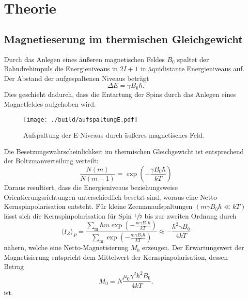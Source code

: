 \section{Theorie}%
\label{sec:theorie}
\subsection{Magnetieserung im thermischen Gleichgewicht}%
\label{ssub:magnetieserung_im_thermischen_gleichgewicht}
Durch das Anlegen eines äußeren magnetischen Feldes $B_0$ spaltet der Bahndrehimpuls die Energieniveaus in $2 I
+ 1$ in äquidistante Energieniveaus auf. 
Der Abstand der aufgespaltenen Niveaus beträgt 
\begin{equation}
		\label{eq:delta_e}
		\Delta E = \gamma B_0 \hbar. 
\end{equation}
Dies geschieht dadurch, dass die Entartung der Spins durch das Anlegen eines
Magnetfeldes aufgehoben wird.
\begin{figure}[ht]
		\centering
		\texttt{[image: ./build/aufspaltungE.pdf]}
		\caption{Aufspaltung der E-Niveaus durch äußeres magnetisches
		Feld. \cite{anleitung}}
		\label{fig:aufsp_E}
\end{figure}
Die Besetzungswahrscheinlichkeit im thermischen Gleichgewicht ist entsprechend
der Boltzmanverteilung verteilt:
\begin{equation}
		\label{eq:boltzmann}
		\frac{N(m)}{N(m-1)} = \exp \left( - \frac{\gamma B_0 \hbar}{kT} \right)
\end{equation}
Daraus resultiert, dass die Energieniveaus beziehungsweise Orientierungsrichtungen unterschiedlich
besetzt sind, woraus eine Netto-Kernspinpolarisation entsteht. 
Für kleine Zeemanaufspaltungen $(m \gamma B_0 \hbar \ll kT)$ lässt sich die
Kernspinpolarisation für Spin $\sfrac{1}{2}$ bis zur
zweiten Ordnung durch
\begin{equation}
		\label{eq:kernpo}
		\langle I_Z \rangle_P = \frac{\sum_\text{m} \hbar m \exp\left(-\frac{m \gamma B_0
		\hbar}{kT}\right)}{\sum_\text{m}\exp\left(-\frac{m \gamma B_0
		\hbar}{kT}\right)} \approx - \frac{\hbar^2 \gamma B_0}{4 kT}
\end{equation}
nähern, welche eine Netto-Magnetisierung $M_0$ erzeugen. 
Der Erwartungswert der Magnetisierung entspricht dem Mittelwert der
Kernspinpolarisation, dessen Betrag 
\begin{equation}
		\label{eq:magn}
		M_0 = N \frac{\mu_0 \gamma^2 \hbar^2 B_0}{4 kT} .
\end{equation}
ist.

